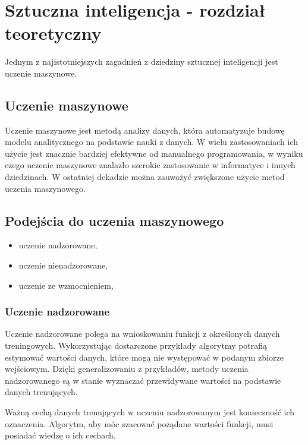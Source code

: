 \chapter{Sztuczna inteligencja - rozdział teoretyczny}
\label{cha:ogolnyrozdzialteoretyczny}

Jednym z najistotniejszych zagadnień z dziedziny sztucznej inteligencji jest uczenie maszynowe. 


\section{Uczenie maszynowe}

Uczenie maszynowe jest metodą analizy danych, która automatyzuje budowę modelu analitycznego na podstawie nauki z 
danych. W wielu zastosowaniach ich użycie jest znacznie bardziej efektywne od manualnego programowania, w wyniku czego 
uczenie maszynowe znalazło szerokie zastosowanie w informatyce i innych dziedzinach.
W ostatniej dekadzie można zauważyć zwiększone użycie metod uczenia maszynowego\cite{domingos2012few}.

\section{Podejścia do uczenia maszynowego}
\label{sec:podejsciadouczeniamaszynowego}

\begin{itemize}
 \item uczenie nadzorowane,
 \item uczenie nienadzorowane,
 \item uczenie ze wzmocnieniem,
\end{itemize}

\subsection{Uczenie nadzorowane}
\label{subsec:uczenienadzorowane}

Uczenie nadzorowane polega na wnioskowaniu funkcji z określonych danych treningowych.
Wykorzystując dostarczone przykłady algorytmy potrafią estymować wartości danych, które mogą nie występować w 
podanym zbiorze wejściowym. Dzięki generalizowaniu z przykładów, metody uczenia nadzorowanego są w stanie 
wyznaczać przewidywane wartości na podstawie danych trenujących.

Ważną cechą danych trenujących w uczeniu nadzorowanym jest konieczność ich oznaczenia. Algorytm, aby móc 
szacować pożądane wartości funkcji, musi posiadać wiedzę o ich cechach.

